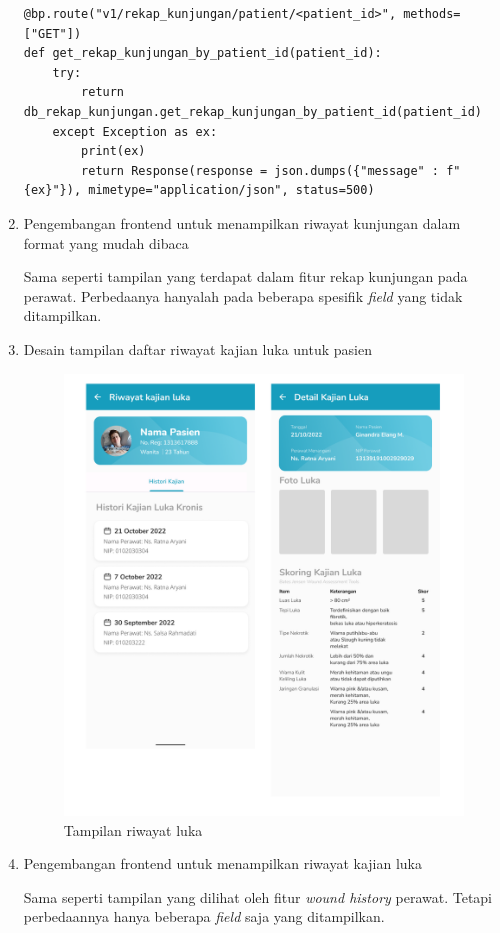\begin{enumerate}
\begin{lstlisting}
@bp.route("v1/rekap_kunjungan/patient/<patient_id>", methods=["GET"])
def get_rekap_kunjungan_by_patient_id(patient_id):
    try:
        return db_rekap_kunjungan.get_rekap_kunjungan_by_patient_id(patient_id)
    except Exception as ex:
        print(ex)
        return Response(response = json.dumps({"message" : f"{ex}"}), mimetype="application/json", status=500)
\end{lstlisting}
\item Pengembangan frontend untuk menampilkan riwayat kunjungan dalam format yang mudah dibaca

Sama seperti tampilan yang terdapat dalam fitur rekap kunjungan pada perawat. Perbedaanya hanyalah pada beberapa spesifik \textit{field} yang tidak ditampilkan.

\item Desain tampilan daftar riwayat kajian luka untuk pasien

	\begin{figure}[H]
		\centering
		\includegraphics[keepaspectratio, width=12cm]{gambar/tampilan_riwayat_luka}
		\caption{Tampilan riwayat luka}
		\label{gambar:tampilan_riwayat_luka}
	\end{figure}
\item Pengembangan frontend untuk menampilkan riwayat kajian luka

Sama seperti tampilan yang dilihat oleh fitur \textit{wound history} perawat. Tetapi perbedaannya hanya beberapa \textit{field} saja yang ditampilkan.
\end{enumerate}

